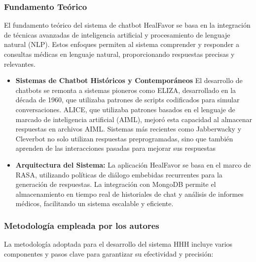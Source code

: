 \subsubsection{Fundamento Teórico}
El fundamento teórico del sistema de chatbot HealFavor se basa en la integración de técnicas avanzadas de inteligencia artificial y procesamiento de lenguaje natural (NLP). Estos enfoques permiten al sistema comprender y responder a consultas médicas en lenguaje natural, proporcionando respuestas precisas y relevantes.

\begin{itemize}
	
	\item \textbf{ Sistemas de Chatbot Históricos y Contemporáneos}
		El desarrollo de chatbots se remonta a sistemas pioneros como ELIZA, desarrollado en la década de 1960, que utilizaba patrones de scripts codificados para simular conversaciones. ALICE, que utilizaba patrones basados en el lenguaje de marcado de inteligencia artificial (AIML), mejoró esta capacidad al almacenar respuestas en archivos AIML. Sistemas más recientes como Jabberwacky y Cleverbot no solo utilizan respuestas preprogramadas, sino que también aprenden de las interacciones pasadas para mejorar sus respuestas
	
	\item \textbf{Arquitectura del Sistema:} La aplicación HealFavor se basa en el marco de RASA, utilizando políticas de diálogo embebidas recurrentes para la generación de respuestas. La integración con MongoDB permite el almacenamiento en tiempo real de historiales de chat y análisis de informes médicos, facilitando un sistema escalable y eficiente.
	
	
\end{itemize}


\subsubsection{Metodología empleada por los autores}
La metodología adoptada para el desarrollo del sistema HHH incluye varios componentes y pasos clave para garantizar su efectividad y precisión:

